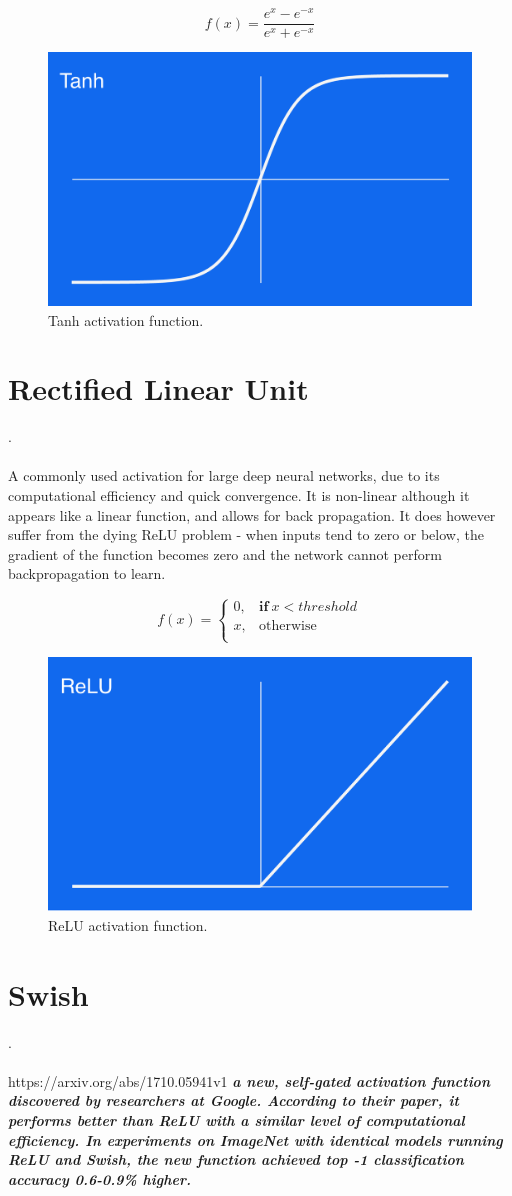 \begin{appendices}
\begin{equation}
    f(x) = \frac {e^x - e^{-x}} {e^x + e^{-x}}
\end{equation}
\begin{figure}[H]
\centering
\includegraphics[width=.265\textwidth]{4fig/tanh.png}
\caption{Tanh activation function.}
\end{figure}


\section{Rectified Linear Unit}.\\\\
A commonly used activation for large deep neural networks, due to its computational efficiency and quick convergence. It is non-linear although it appears like a linear function, and allows for back propagation. It does however suffer from the dying ReLU problem - when inputs tend to zero or below, the gradient of the function becomes zero and the network cannot perform backpropagation to learn.

\begin{equation}
f(x) =
    \begin{cases}
      0 , & \mathbf{if} \ x < threshold \\
      x , & \text{otherwise}\\
    \end{cases}
  \end{equation}
\begin{figure}[H]
\centering
\includegraphics[width=.265\textwidth]{4fig/relu.png}
\caption{ReLU activation function.}
\end{figure}



\section{Swish}.\\\\
https://arxiv.org/abs/1710.05941v1
\textbf{\textit{a new, self-gated activation function discovered by researchers at Google. According to their paper, it performs better than ReLU with a similar level of computational efficiency. In experiments on ImageNet with identical models running ReLU and Swish, the new function achieved top -1 classification accuracy 0.6-0.9\% higher.}}


\end{appendices}
